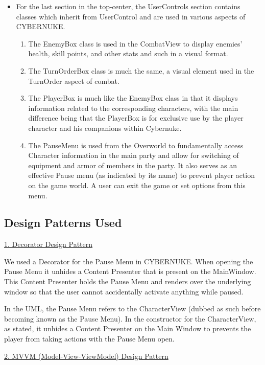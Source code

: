 \documentclass[10pt,conference,onecolumn,compsoc]{IEEEtran}
\begin{document}
\begin{itemize}
\item For the last section in the top-center, the UserControls section contains classes which inherit from UserControl and are used in various aspects of CYBERNUKE. 

	\begin{enumerate}
	\item The EnemyBox class is used in the CombatView to display enemies' health, skill points, and other stats and such in a visual format. 
	\item The TurnOrderBox class is much the same, a visual element used in the TurnOrder aspect of combat.
	\item The PlayerBox is much like the EnemyBox class in that it displays information related to the corresponding characters, with the main difference being that the PlayerBox is for exclusive use by the player character and his companions within Cybernuke.
	\item The PauseMenu is used from the Overworld to fundamentally access Character information in the main party and allow for switching of equipment and armor of members in the party. It also serves as an effective Pause menu (as indicated by its name) to prevent player action on the game world. A user can exit the game or set options from this menu.
	\end{enumerate}

\end{itemize}
\subsection{Design Patterns Used}
\underline{1. Decorator Design Pattern}
\vspace{5px}

We used a Decorator for the Pause Menu in CYBERNUKE. When opening the Pause Menu it unhides a Content Presenter that is present on the MainWindow. This Content Presenter holds the Pause Menu and renders over the underlying window so that the user cannot accidentally activate anything while paused.

In the UML, the Pause Menu refers to the CharacterView (dubbed as such before becoming known as the Pause Menu). In the constructor for the CharacterView, as stated, it unhides a Content Presenter on the Main Window to prevents the player from taking actions with the Pause Menu open.

\underline{2. MVVM (Model-View-ViewModel) Design Pattern}
\vspace{5px}
\end{document}
